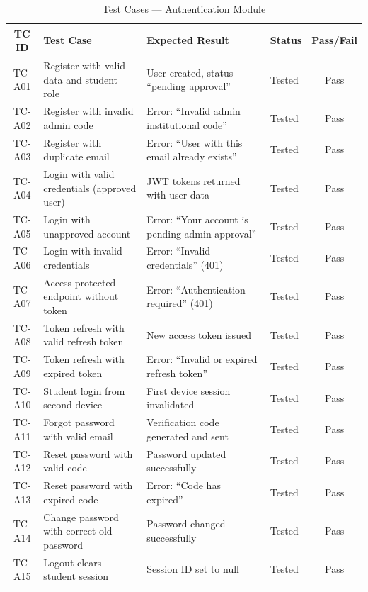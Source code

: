 \begin{table}[H]
\centering
\caption{Test Cases --- Authentication Module}
\label{tab:test_auth}
\footnotesize
\begin{tabular}{|c|p{4cm}|p{4cm}|p{2cm}|c|}
\hline
\textbf{TC ID} & \textbf{Test Case} & \textbf{Expected Result} & \textbf{Status} & \textbf{Pass/Fail} \\
\hline
TC-A01 & Register with valid data and student role & User created, status ``pending approval'' & Tested & Pass \\
\hline
TC-A02 & Register with invalid admin code & Error: ``Invalid admin institutional code'' & Tested & Pass \\
\hline
TC-A03 & Register with duplicate email & Error: ``User with this email already exists'' & Tested & Pass \\
\hline
TC-A04 & Login with valid credentials (approved user) & JWT tokens returned with user data & Tested & Pass \\
\hline
TC-A05 & Login with unapproved account & Error: ``Your account is pending admin approval'' & Tested & Pass \\
\hline
TC-A06 & Login with invalid credentials & Error: ``Invalid credentials'' (401) & Tested & Pass \\
\hline
TC-A07 & Access protected endpoint without token & Error: ``Authentication required'' (401) & Tested & Pass \\
\hline
TC-A08 & Token refresh with valid refresh token & New access token issued & Tested & Pass \\
\hline
TC-A09 & Token refresh with expired token & Error: ``Invalid or expired refresh token'' & Tested & Pass \\
\hline
TC-A10 & Student login from second device & First device session invalidated & Tested & Pass \\
\hline
TC-A11 & Forgot password with valid email & Verification code generated and sent & Tested & Pass \\
\hline
TC-A12 & Reset password with valid code & Password updated successfully & Tested & Pass \\
\hline
TC-A13 & Reset password with expired code & Error: ``Code has expired'' & Tested & Pass \\
\hline
TC-A14 & Change password with correct old password & Password changed successfully & Tested & Pass \\
\hline
TC-A15 & Logout clears student session & Session ID set to null & Tested & Pass \\
\hline
\end{tabular}
\end{table}

